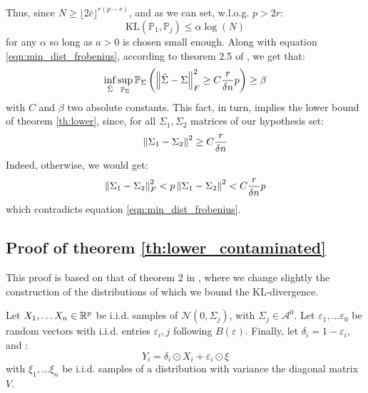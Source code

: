 \documentclass{article}
\numberwithin{equation}{section}
\numberwithin{equation}{section}
\begin{document}
            Thus, since $N \geq \lfloor 2 \bar{c} \rfloor ^{r(p-r)}$, and as we can set, w.l.o.g. $p > 2r$:
            \begin{equation}
                \text{KL}(\mathbb{P}_1, \mathbb{P}_j) \leq \alpha\log (N)
            \end{equation}
            for any $\alpha$ so long as $a>0$ is chosen small enough. Along with equation \ref{eqn:min_dist_frobenius}, according to theorem 2.5 of \cite{tsybakovNonparametricEstimators2009}, we get that:
            \begin{equation}
            \inf_{\hat{\Sigma}} \sup_{\mathbb{P}_\Sigma} \mathbb{P}_\Sigma \left( \left\Vert \hat{\Sigma} - \Sigma \right\Vert_F^2 \geq C \frac{r}{\delta n}p \right) \geq \beta
            \end{equation}
            with $C$ and $\beta$ two absolute constants. This fact, in turn, implies the lower bound of theorem \ref{th:lower}, since, for all $\Sigma_1, \Sigma_2$ matrices of our hypothesis set:
            \begin{equation}
                \left\Vert \Sigma_1-\Sigma_2 \right\Vert^2 \geq C \frac{r}{\delta n}
            \end{equation}
            Indeed, otherwise, we would get:
            \begin{equation}
                \left\Vert \Sigma_1-\Sigma_2 \right\Vert_F^2 < p\left\Vert \Sigma_1-\Sigma_2 \right\Vert^2 < C\frac{r}{\delta n}p
            \end{equation}
            which contradicts equation \ref{eqn:min_dist_frobenius}.
        
        \subsection{Proof of theorem \ref{th:lower_contaminated}}
            \label{proof:lower_contaminated}
            
            This proof is based on that of theorem 2 in \cite{louniciHighdimensionalCovarianceMatrix2014}, where we change slightly the construction of the distributions of which we bound the KL-divergence.
            
            Let $X_1, \dots X_n \in \mathbb{R}^p$ be i.i.d. samples of $\mathcal{N}(0, \Sigma_j)$, with $\Sigma_j \in \mathcal{A}^0$. Let $\varepsilon_1, \dots \varepsilon_0$ be random vectors with i.i.d. entries $\varepsilon_i,j$ following $B(\varepsilon)$. Finally, let $\delta_i = 1-\varepsilon_i$, and :
            \begin{equation}
                Y_i = \delta_i \odot X_i + \varepsilon_i \odot \xi
            \end{equation}
            with $\xi_1, \dots \xi_n$ be i.i.d. samples of a distribution with variance the diagonal matrix $V$.
            
\end{document}
